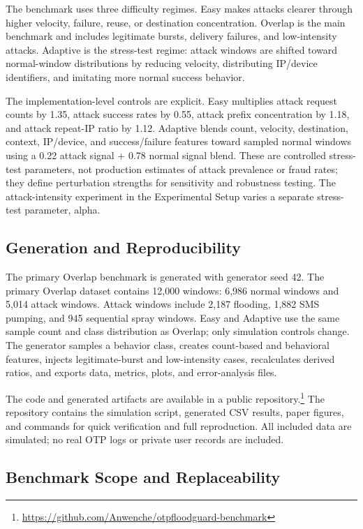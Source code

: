 \documentclass[conference]{IEEEtran}
\begin{document}
The benchmark uses three difficulty regimes. Easy makes attacks clearer through higher velocity, failure, reuse, or destination concentration. Overlap is the main benchmark and includes legitimate bursts, delivery failures, and low-intensity attacks. Adaptive is the stress-test regime: attack windows are shifted toward normal-window distributions by reducing velocity, distributing IP/device identifiers, and imitating more normal success behavior.

The implementation-level controls are explicit. Easy multiplies attack request counts by 1.35, attack success rates by 0.55, attack prefix concentration by 1.18, and attack repeat-IP ratio by 1.12. Adaptive blends count, velocity, destination, context, IP/device, and success/failure features toward sampled normal windows using a 0.22 attack signal + 0.78 normal signal blend. These are controlled stress-test parameters, not production estimates of attack prevalence or fraud rates; they define perturbation strengths for sensitivity and robustness testing. The attack-intensity experiment in the Experimental Setup varies a separate stress-test parameter, alpha.

\subsection{Generation and Reproducibility}

The primary Overlap benchmark is generated with generator seed 42. The primary Overlap dataset contains 12,000 windows: 6,986 normal windows and 5,014 attack windows. Attack windows include 2,187 flooding, 1,882 SMS pumping, and 945 sequential spray windows. Easy and Adaptive use the same sample count and class distribution as Overlap; only simulation controls change. The generator samples a behavior class, creates count-based and behavioral features, injects legitimate-burst and low-intensity cases, recalculates derived ratios, and exports data, metrics, plots, and error-analysis files.

The code and generated artifacts are available in a public repository.\footnote{\url{https://github.com/Anwenche/otpfloodguard-benchmark}} The repository contains the simulation script, generated CSV results, paper figures, and commands for quick verification and full reproduction. All included data are simulated; no real OTP logs or private user records are included.

\subsection{Benchmark Scope and Replaceability}
\end{document}
